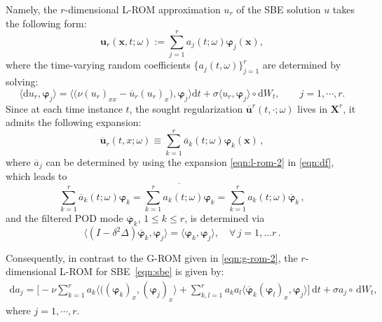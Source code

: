 \documentclass[11pt]{amsart}
\numberwithin{equation}{section}
\def\d{\, \mathrm{d}}
\def\be{\begin{equation}}
\def\ee{\end{equation}}
\def\bea{\begin{equation} \begin{aligned}}
\def\eea{\end{aligned} \end{equation}}
\newcommand{\oa}{\overline{a}}
\newcommand{\bu}{\boldsymbol{u}}
\newcommand{\obu}{\overline{\boldsymbol u}}
\newcommand{\bx}{\boldsymbol{x}}
\newcommand{\bX}{\boldsymbol{X}}
\newcommand{\bphi}{\boldsymbol{\varphi}}
\begin{document}
Namely, the $r$-dimensional L-ROM approximation $u_r$ of the SBE solution $u$ takes the following form:
\begin{equation}    
	{\bu}_r(\bx,t; \omega) 
	:=  \sum_{j=1}^r a_j(t; \omega) \bphi_j(\bx),
	\label{eqn:l-rom-0}
\end{equation} 
where the time-varying random coefficients $\{a_{j}(t, \omega)\}_{j=1}^{r}$ are determined by solving:
 \be  \label{eqn:l-rom-1}
\big \langle \mathrm{d} u_r, \bphi_j \big \rangle  = \big \langle \big( \nu (u_r)_{xx}  - \overline{u}_r  (u_r)_x\big), \bphi_j \big \rangle \mathrm{d} t + \sigma \langle u_r, \bphi_j \rangle  \circ \mathrm{d}W_t, \qquad j = 1, \cdots, r.
\ee 
Since at each time instance $t$, the sought regularization $\obu^r(t,\cdot; \omega)$ lives in $\bX^r$, it admits the following expansion:
\begin{equation}    
	{\obu}_r (t,x;\omega)
	\equiv \sum_{k=1}^r \oa_k(t;\omega) \bphi_k(\bx)  \, ,
	\label{eqn:l-rom-2}
\end{equation} 
where $\oa_j$  can be determined by using the expansion \eqref{eqn:l-rom-2} in \eqref{eqn:df}, which leads to
\begin{equation}    
	\sum_{k=1}^r \oa_k(t;\omega) \bphi_k
	= \overline{ \sum_{k=1}^r a_k (t;\omega) \bphi_k }  = \sum_{k=1}^r a_k (t;\omega) \overline{\bphi}_k \, ,
\end{equation} 
and the filtered POD mode $ \overline{\bphi}_k$, $1\le k \le r$, is determined via
\be
\big \langle  \left(I - \delta^2 \Delta \right) \overline{\bphi}_k , \bphi_j
	\big \rangle
	= \langle \bphi_k, \bphi_j\rangle,
	\quad \forall \, j=1, \ldots r \, .
	\label{eqn:df_phi}
\ee

Consequently, in contrast to the G-ROM given in \eqref{eqn:g-rom-2}, the $r$-dimensional L-ROM for SBE~\eqref{eqn:sbe} is given by:
\bea \label{eqn:l-rom-3}
\mathrm{d} a_j = \Big [ - \nu  \sum_{k = 1}^r  a_k \big \langle \big( (\bphi_k)_{x}, (\bphi_j)_{x} \big \rangle   + \sum_{k,l = 1}^r a_k a_l   \big \langle \overline{\bphi}_k (\bphi_l)_x, \bphi_j \big \rangle \Big] \d t + \sigma a_j  \circ \d W_t,
\eea
where $j = 1, \cdots, r$. 

	
	
\end{document}
